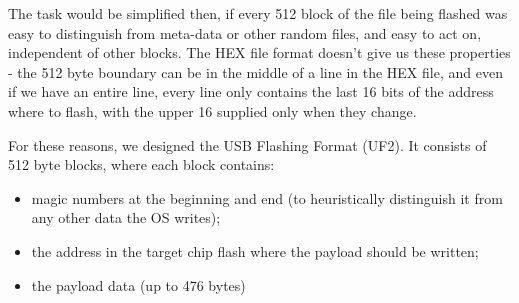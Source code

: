 The task would be simplified then, if every 512 block of the file being flashed was easy to distinguish from meta-data
or other random files, and easy to act on, independent of other blocks. The HEX file format doesn't give us these properties 
- the 512 byte boundary can be in the middle of a line in the HEX file, and even if we have an entire line, every line only
contains the last 16 bits of the address where to flash, with the upper 16 supplied only when they change.

For these reasons, we designed the USB Flashing Format (UF2). It consists of 512 byte blocks, where each block contains:
\begin{itemize}
\item magic numbers at the beginning and end (to heuristically distinguish it from any other data the OS writes);
\item the address in the target chip flash where the payload should be written;
\item the payload data (up to 476 bytes)
\end{itemize}

